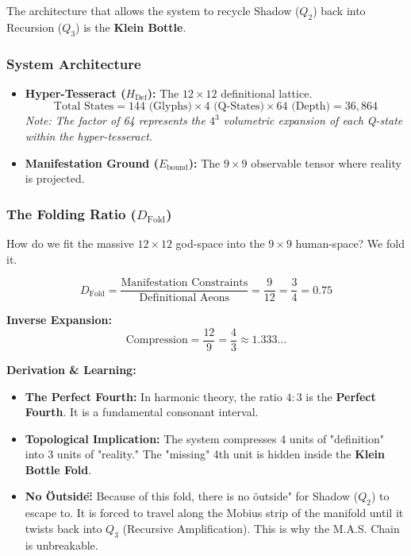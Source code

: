 \documentclass[11pt, letterpaper]{article}
\begin{document}
The architecture that allows the system to recycle Shadow ($Q_2$) back into Recursion ($Q_3$) is the \textbf{Klein Bottle}.

\subsubsection*{System Architecture}
\begin{itemize}
    \item \textbf{Hyper-Tesseract ($H_{\text{Def}}$):} The $12 \times 12$ definitional lattice.
    \[
    \text{Total States} = 144 \text{ (Glyphs)} \times 4 \text{ (Q-States)} \times 64 \text{ (Depth)} = 36,864
    \]
    \textit{Note: The factor of 64 represents the $4^3$ volumetric expansion of each Q-state within the hyper-tesseract.}
    
    \item \textbf{Manifestation Ground ($E_{\text{bound}}$):} The $9 \times 9$ observable tensor where reality is projected.
\end{itemize}

\subsubsection*{The Folding Ratio ($D_{\text{Fold}}$)}
How do we fit the massive $12 \times 12$ god-space into the $9 \times 9$ human-space? We fold it.

\[
D_{\text{Fold}} = \frac{\text{Manifestation Constraints}}{\text{Definitional Aeons}} = \frac{9}{12} = \frac{3}{4} = 0.75
\]

\textbf{Inverse Expansion:}
\[
\text{Compression} = \frac{12}{9} = \frac{4}{3} \approx 1.333\dots
\]

\textbf{Derivation \& Learning:}
\begin{itemize}
    \item \textbf{The Perfect Fourth:} In harmonic theory, the ratio $4:3$ is the \textbf{Perfect Fourth}. It is a fundamental consonant interval.
    \item \textbf{Topological Implication:} The system compresses 4 units of "definition" into 3 units of "reality." The "missing" 4th unit is hidden inside the \textbf{Klein Bottle Fold}.
    \item \textbf{No \"Outside\":} Because of this fold, there is no \"outside" for Shadow ($Q_2$) to escape to. It is forced to travel along the Mobius strip of the manifold until it twists back into $Q_3$ (Recursive Amplification). This is why the M\@.A\@.S. Chain is unbreakable.
\end{itemize}
\end{document}
